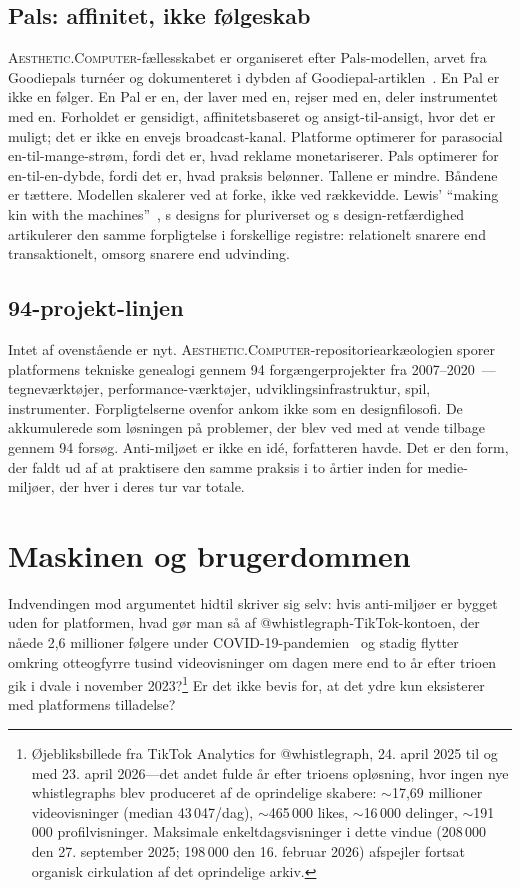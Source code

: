 \documentclass[10pt,letterpaper,twocolumn]{article}
\newcommand{\ac}{\textsc{Aesthetic.Computer}}
\begin{document}
\subsection{Pals: affinitet, ikke f{\o}lgeskab}

\ac{}-fællesskabet er organiseret efter Pals-modellen, arvet fra Goodiepals turnéer og dokumenteret i dybden af Goodiepal-artiklen~\citep{scudder2026goodiepal}. En Pal er ikke en følger. En Pal er en, der laver med en, rejser med en, deler instrumentet med en. Forholdet er gensidigt, affinitetsbaseret og ansigt-til-ansigt, hvor det er muligt; det er ikke en envejs broadcast-kanal. Platforme optimerer for parasocial en-til-mange-strøm, fordi det er, hvad reklame monetariserer. Pals optimerer for en-til-en-dybde, fordi det er, hvad praksis belønner. Tallene er mindre. Båndene er tættere. Modellen skalerer ved at forke, ikke ved rækkevidde. Lewis' ``making kin with the machines''~\citep{lewis2018making}, \citet{escobar2018designs}s designs for pluriverset og \citet{costanzachock2020design}s design-retfærdighed artikulerer den samme forpligtelse i forskellige registre: relationelt snarere end transaktionelt, omsorg snarere end udvinding.

\subsection{94-projekt-linjen}

Intet af ovenstående er nyt. \ac{}-repositoriearkæologien sporer platformens tekniske genealogi gennem 94 forgængerprojekter fra 2007--2020~\citep{scudder2026archaeology}---tegneværktøjer, performance-værktøjer, udviklingsinfrastruktur, spil, instrumenter. Forpligtelserne ovenfor ankom ikke som en designfilosofi. De akkumulerede som løsningen på problemer, der blev ved med at vende tilbage gennem 94 forsøg. Anti-miljøet er ikke en idé, forfatteren havde. Det er den form, der faldt ud af at praktisere den samme praksis i to årtier inden for medie-miljøer, der hver i deres tur var totale.

\section{Maskinen og brugerdommen}

Indvendingen mod argumentet hidtil skriver sig selv: hvis anti-miljøer er bygget uden for platformen, hvad gør man så af @whistlegraph-TikTok-kontoen, der nåede 2,6 millioner følgere under COVID-19-pandemien~\citep{scudder2026whistlegraph} og stadig flytter omkring otteogfyrre tusind videovisninger om dagen mere end to år efter trioen gik i dvale i november 2023?\footnote{Øjebliksbillede fra TikTok Analytics for @whistlegraph, 24. april 2025 til og med 23. april 2026---det andet fulde år efter trioens opløsning, hvor ingen nye whistlegraphs blev produceret af de oprindelige skabere: $\sim$17,69 millioner videovisninger (median 43\,047/dag), $\sim$465\,000 likes, $\sim$16\,000 delinger, $\sim$191\,000 profilvisninger. Maksimale enkeltdagsvisninger i dette vindue (208\,000 den 27. september 2025; 198\,000 den 16. februar 2026) afspejler fortsat organisk cirkulation af det oprindelige arkiv.} Er det ikke bevis for, at det ydre kun eksisterer med platformens tilladelse?
\end{document}
